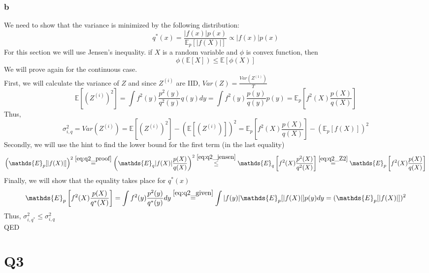 \documentclass[11pt]{article}
\begin{document}
\section*{b}
We need to show that the variance is minimized by the following distribution:
\begin{equation}\label{eq:q2_given}
	q^*(x)=\frac{|f(x)|p(x)}{\mathds{E}_p[|f(X)|]}\propto |f(x)|p(x)
\end{equation}
For this section we will use Jensen's inequality. if $X$ is a random variable and $\phi$ is convex function, then
\begin{equation}\label{eq:q2_jensen}
	\phi\left(\mathds{E}[X]\right) \le \mathds{E}\left[\phi(X)\right]
\end{equation}
We will prove again for the continuous case. \\
First, we will calculate the variance of $Z$ and since $Z^{(i)}$ are IID, $Var(Z)=\frac{Var(Z^{(1)})}{T}$
\begin{equation}\label{eq:q2_Z2}
	\mathds{E}[(Z^{(i)})^2]=\int f^2(y)\frac{p^2(y)}{q^2(y)}q(y)dy=	\int f^2(y)\frac{p(y)}{q(y)}p(y) = \mathds{E}_p\left[f^2(X)\frac{p(X)}{q(X)}\right]
\end{equation}
Thus,
\begin{equation*}
	\sigma_{i,q}^2=Var\left(Z^{(i)}\right)=\mathds{E}\left[(Z^{(i)})^2\right]-\left(\mathds{E}[(Z^{(i)})]\right)^2 = \mathds{E}_p\left[f^2(X)\frac{p(X)}{q(X)}\right]-\left(\mathds{E}_p[f(X)]\right)^2
\end{equation*}
Secondly, we will use the hint to find the lower bound for the first term (in the last equality)
\begin{align*}
\left(\mathds{E}_p[|f(X)|]\right)^2 \overset{\eqref{eq:q2_proof}}{=} \left(\mathds{E}_{q}|f(X)|\frac{p(X)}{q(X)}\right)^2 \overset{\eqref{eq:q2_jensen}}{\le} \mathds{E}_q\left[f^2(X)\frac{p^2(X)}{q^2(X)}\right] \overset{\eqref{eq:q2_Z2}}{=} \mathds{E}_p\left[f^2(X) \frac{p(X)}{q(X)}\right]
\end{align*}
Finally, we will show that the equality takes place for $q^*(x)$
\begin{equation*}
	\mathds{E}_p\left[f^2(X)\frac{p(X)}{q^*(X)}\right]=\int f^2(y)\frac{p^2(y)}{q^*(y)}dy \overset{\eqref{eq:q2_given}}{=} \int |f(y)|\mathds{E}_p[|f(X)|]p(y)dy=(\mathds{E}_p[|f(X)|])^2
\end{equation*}
Thus, $\sigma_{i,q^*}^2 \le \sigma_{i,q}^2$ \\
QED
\part*{Q3}
\end{document}

